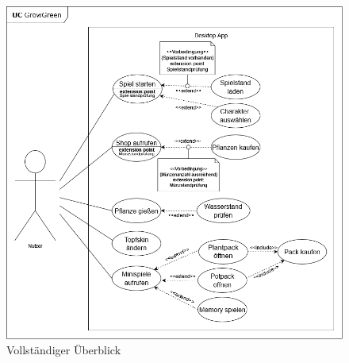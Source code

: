\begin{figure}[h]
    \centering
    \includegraphics[width=0.8\linewidth]{../bilder/uc_gesamt}
    \vspace{0.05cm}
    \caption{Vollständiger Überblick}
    \label{fig:uc_gesamt}
\end{figure}

\newpage
